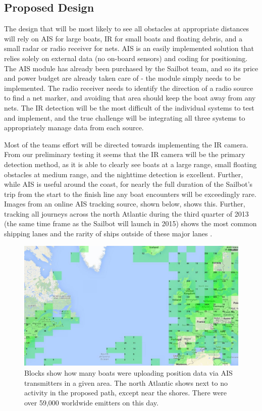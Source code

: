 \subsection{\label{sec:method:proposed-design}Proposed Design}
The design that will be most likely to see all obstacles at appropriate distances will rely on AIS for large boats, IR for small boats and floating debris, and  a small radar or radio receiver for nets. AIS is an easily implemented solution that relies solely on external data (no on-board sensors) and coding for positioning. The AIS module has already been purchased by the Sailbot team, and so its price and power budget are already taken care of - the module simply needs to be implemented. The radio receiver needs to identify the direction of a radio source to find a net marker, and avoiding that area should keep the boat away from any nets. The IR detection will be the most difficult of the individual systems to test and implement, and the true challenge will be integrating all three systems to appropriately manage data from each source.

Most of the teams effort will be directed towards implementing the IR camera. From our preliminary testing it seems that the IR camera will be the primary detection method, as it is able to clearly see boats at a large range, small floating obstacles at medium range, and the nighttime detection is excellent. Further, while AIS is useful around the coast, for nearly the full duration of the Sailbot's trip from the start to the finish line any boat encounters will be exceedingly rare. Images from an online AIS tracking source, shown below, shows this. Further, tracking all journeys across the north Atlantic during the third quarter of 2013 (the same time frame as the Sailbot will launch in 2015) shows the most common shipping lanes and the rarity of ships outside of these major lanes \cite{marine-traffic}.

\begin{figure}
\centering
\includegraphics[width=120mm,natwidth=540,natheight=459]{"./image/AIS_emitters_north_atlantic"}
\caption[All AIS emitters in the North Atlantic on Wednesday, November 26 2014.]{\label{fig:ais-emitters}Blocks show how many boats were uploading position data via AIS transmitters in a given area. The north Atlantic shows next to no activity in the proposed path, except near the shores. There were over 59,000 worldwide emitters on this day.}
\end{figure}

